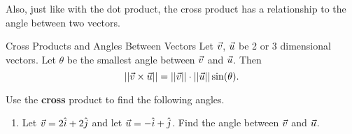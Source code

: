 Also, just like with the dot product, the cross product has a relationship to the angle between two vectors.

\begin{theorem}{Cross Products and Angles Between Vectors}
Let $\vec{v}$, $\vec{u}$ be 2 or 3 dimensional vectors. Let $\theta$ be the smallest angle between $\vec{v}$ and $\vec{u}$. Then $$||\vec{v}\times\vec{u}||=||\vec{v}||\cdot||\vec{u}||\sin(\theta). $$
\end{theorem}

\begin{exercise}{}
Use the \textbf{cross} product to find the following angles.
\begin{enumerate}
\item Let $\vec{v}=2\hat{i}+2\hat{j}$ and let $\vec{u}=-\hat{i}+\hat{j}$. Find the angle between $\vec{v}$ and $\vec{u}$.
\vspace{1em}
\vspace{1em}
\end{enumerate}
\end{exercise}